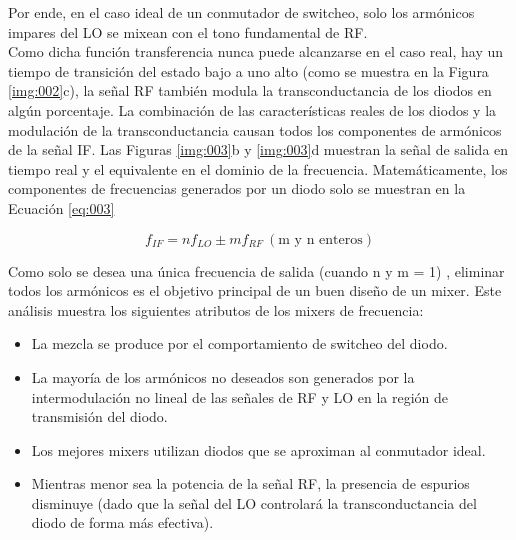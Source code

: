 \documentclass[a4paper,10pt]{article}
\begin{document}
	\indent Por ende, en el caso ideal de un conmutador de switcheo, solo los 
	armónicos impares del LO se mixean con el tono fundamental de RF. \\
	\indent Como dicha función transferencia nunca puede alcanzarse en el caso 
	real, hay un tiempo de transición del estado bajo a uno alto (como se 
	muestra en la Figura \ref{img:002}c), la señal RF tambi\'en modula la 
	transconductancia de los diodos en algún porcentaje. La combinación de las 
	características reales de los diodos y la modulación de la transconductancia
	causan todos los componentes de armónicos de la señal IF. Las Figuras 
	\ref{img:003}b y \ref{img:003}d muestran la señal de salida en tiempo real y
	el equivalente en el dominio de la frecuencia. Matemáticamente, los 
	componentes de frecuencias generados por un diodo solo se muestran en la 
	Ecuación \ref{eq:003}

	\begin{equation}\label{eq:003}
 		f_{IF} = n f_{LO}\pm m f_{RF}~(\text{m y n enteros})
	\end{equation}

	\indent Como solo se desea una única frecuencia de salida (cuando n y m = 1)
	, eliminar todos los armónicos es el objetivo principal de un buen diseño 
	de un mixer. Este análisis muestra los siguientes atributos de los mixers de
	frecuencia:

	\begin{itemize}
		\item La mezcla se produce por el comportamiento de switcheo del diodo.
		\item La mayoría de los armónicos no deseados son generados por la 
		intermodulación no lineal de las señales de RF y LO en la región de 
		transmisión del diodo.
		\item Los mejores mixers utilizan diodos que se aproximan al conmutador 
		ideal.
		\item Mientras menor sea la potencia de la señal RF, la presencia de 
		espurios disminuye (dado que la señal del LO controlará la 
		transconductancia del diodo de forma más efectiva).
	\end{itemize}
\end{document}
